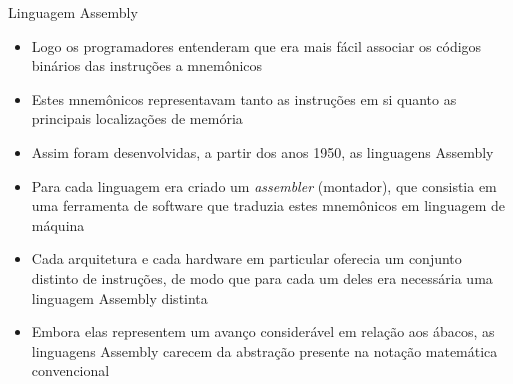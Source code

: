 \begin{frame}[fragile]{Linguagem Assembly}

    \begin{itemize}
        \item Logo os programadores entenderam que era mais fácil associar os códigos binários
            das instruções a mnemônicos

        \item Estes mnemônicos representavam tanto as instruções em si quanto as principais 
            localizações de memória

        \item Assim foram desenvolvidas, a partir dos anos 1950, as linguagens Assembly

        \item Para cada linguagem era criado um \textit{assembler} (montador), que consistia em 
            uma ferramenta de software que traduzia estes mnemônicos em linguagem de máquina

        \item Cada arquitetura e cada hardware em particular oferecia um conjunto distinto de
            instruções, de modo que para cada um deles era necessária uma linguagem Assembly
            distinta

        \item Embora elas representem um avanço considerável em relação aos ábacos, as linguagens
            Assembly carecem da abstração presente na notação matemática convencional
    \end{itemize}

\end{frame}
